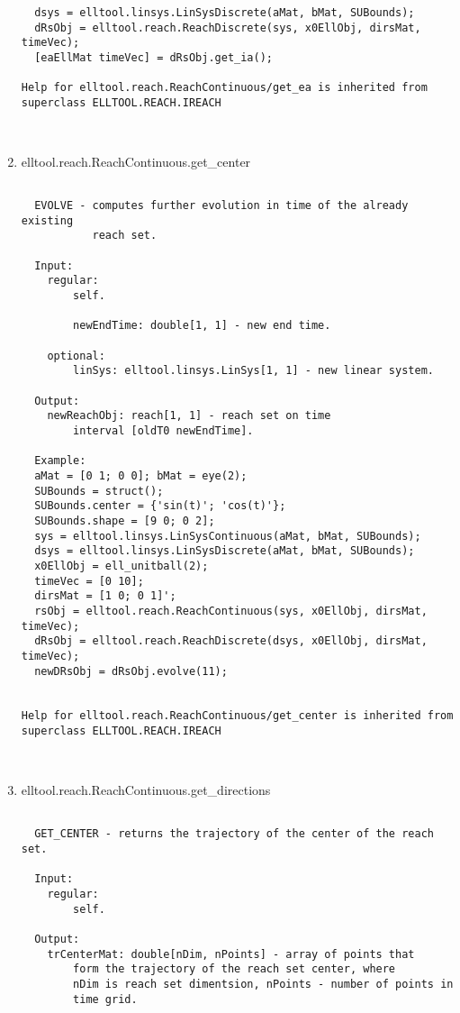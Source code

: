 \begin{enumerate}
\begin{lstlisting}
  dsys = elltool.linsys.LinSysDiscrete(aMat, bMat, SUBounds);
  dRsObj = elltool.reach.ReachDiscrete(sys, x0EllObj, dirsMat, timeVec);
  [eaEllMat timeVec] = dRsObj.get_ia();

Help for elltool.reach.ReachContinuous/get_ea is inherited from superclass ELLTOOL.REACH.IREACH



\end{lstlisting}
\fontfamily{\familydefault}
\selectfont
\item {elltool.reach.ReachContinuous.get\_center}
\selectfont
\begin{lstlisting}

  EVOLVE - computes further evolution in time of the already existing
           reach set.

  Input:
    regular:
        self.

        newEndTime: double[1, 1] - new end time.

    optional:
        linSys: elltool.linsys.LinSys[1, 1] - new linear system.

  Output:
    newReachObj: reach[1, 1] - reach set on time
        interval [oldT0 newEndTime].

  Example:
  aMat = [0 1; 0 0]; bMat = eye(2);
  SUBounds = struct();
  SUBounds.center = {'sin(t)'; 'cos(t)'};
  SUBounds.shape = [9 0; 0 2];
  sys = elltool.linsys.LinSysContinuous(aMat, bMat, SUBounds);
  dsys = elltool.linsys.LinSysDiscrete(aMat, bMat, SUBounds);
  x0EllObj = ell_unitball(2);
  timeVec = [0 10];
  dirsMat = [1 0; 0 1]';
  rsObj = elltool.reach.ReachContinuous(sys, x0EllObj, dirsMat, timeVec);
  dRsObj = elltool.reach.ReachDiscrete(dsys, x0EllObj, dirsMat, timeVec);
  newDRsObj = dRsObj.evolve(11);


Help for elltool.reach.ReachContinuous/get_center is inherited from superclass ELLTOOL.REACH.IREACH



\end{lstlisting}
\fontfamily{\familydefault}
\selectfont
\item {elltool.reach.ReachContinuous.get\_directions}
\selectfont
\begin{lstlisting}

  GET_CENTER - returns the trajectory of the center of the reach set.

  Input:
    regular:
        self.

  Output:
    trCenterMat: double[nDim, nPoints] - array of points that
        form the trajectory of the reach set center, where
        nDim is reach set dimentsion, nPoints - number of points in
        time grid.


\end{lstlisting}
\end{enumerate}
